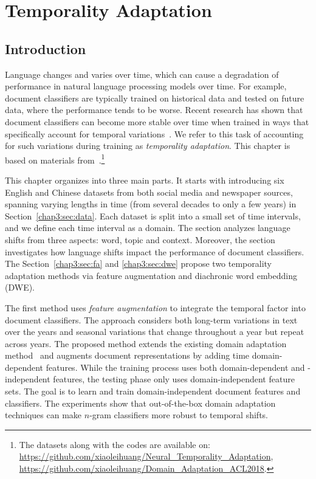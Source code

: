 \chapter{Temporality Adaptation}
\label{chp:temporality}

\section{Introduction}
Language changes and varies over time,
which can cause a degradation of performance in
natural language processing models over time.
For example, document classifiers are typically trained on historical data and tested on future data, where the performance tends to be worse.
Recent research has shown that document classifiers can become more stable over time when trained in ways that specifically account for temporal variations~\cite{he2018time}.
We refer to this task of accounting for such variations during training as {\em temporality adaptation}.
This chapter is based on materials from~\cite{huang2018examining, huang2019neural}.\footnote{The datasets along with the codes are available on: \\\url{https://github.com/xiaoleihuang/Neural_Temporality_Adaptation}, \\\url{https://github.com/xiaoleihuang/Domain_Adaptation_ACL2018}.}

This chapter organizes into three main parts.
It starts with introducing six English and Chinese datasets from both social media and newspaper sources, spanning varying lengths in time (from several decades to only a few years) in Section~\ref{chap3:sec:data}. 
Each dataset is split into a small set of time intervals, and we define each time interval as a domain. 
The section analyzes language shifts from three aspects: word, topic and context. 
Moreover, the section investigates how language shifts impact the performance of document classifiers.
The Section~\ref{chap3:sec:fa} and \ref{chap3:sec:dwe} propose two temporality adaptation methods via feature augmentation and diachronic word embedding (DWE).

The first method uses \textit{feature augmentation} to integrate the temporal factor into document classifiers.
The approach considers both long-term variations in text over the years and seasonal variations that change throughout a year but repeat across years.
The proposed method extends the existing domain adaptation method~\cite{daume2007frustratingly} and augments document representations by adding time domain-dependent features.
While the training process uses both domain-dependent and -independent features, the testing phase only uses domain-independent feature sets.
The goal is to learn and train domain-independent document features and classifiers.
The experiments show that out-of-the-box domain adaptation techniques can make $n$-gram classifiers more robust to temporal shifts.

